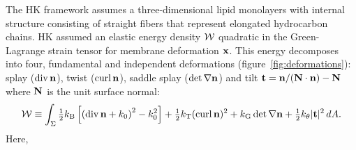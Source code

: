The HK framework assumes a three-dimensional lipid monolayers with internal structure
consisting of straight fibers that represent elongated hydrocarbon chains. HK assumed an
elastic energy density ${\cal W}$ quadratic in the Green-Lagrange strain tensor for membrane deformation ${\bf x}$.
%
%
%
%
%
This energy decomposes into four, fundamental and independent deformations  (figure~\ref{fig:deformations}):
splay ($\operatorname{div} {\bf n}$), twist ($\operatorname{curl} {\bf n}$), saddle splay ($\det \nabla {\bf n}$) and tilt ${\bf t}={\bf n}/({\bf N}\cdot {\bf n}) - {\bf N}$ where ${\bf N}$ is the unit surface normal:
\begin{equation}
\label{ansatz3}
\begin{aligned}
{\cal W} \equiv \int_{\Sigma} 
  \tfrac{1}{2}k_{\mathrm{B}}\left[ \left( \operatorname{div} {\bf n} + k_0\right)^2 - k_0^2\right] 
+ \tfrac{1}{2}k_{\mathrm{T}} (\operatorname{curl} {\bf n})^2 + k_{\mathrm{G}}  \det \nabla {\bf n} + \tfrac{1}{2}k_{\theta} |{\bf t}|^2 \,dA.
\end{aligned}
\end{equation}
Here, 
